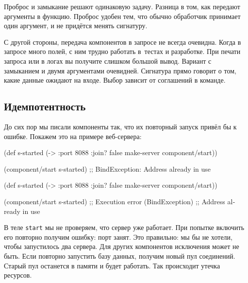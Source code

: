 \fi

Проброс и замыкание решают одинаковую задачу. Разница в том, как передают
аргументы в функцию. Проброс удобен тем, что обычно обработчик принимает один
аргумент, и не придётся менять сигнатуру.

С другой стороны, передача компонентов в запросе не всегда очевидна. Когда в
запросе много полей, с ним трудно работать в~тестах и разработке. При печати
запроса или в логах вы получите слишком большой вывод. Вариант с замыканием и
двумя аргументами очевидней. Сигнатура прямо говорит о том, какие данные ожидают
на входе. Выбор зависит от соглашений в команде.

\subsection{Идемпотентность}

До сих пор мы писали компоненты так, что их повторный запуск привёл бы к
ошибке. Покажем это на примере веб-сервера:

\ifx\DEVICETYPE\MOBILE

\begin{english}
  \begin{clojure}
(def s-started
  (-> {:port 8088 :join? false}
      make-server
      component/start))

(component/start s-started)
;; BindException: Address already in use
  \end{clojure}
\end{english}

\else

\begin{english}
  \begin{clojure}
(def s-started (-> {:port 8088 :join? false}
                    make-server
                    component/start))

(component/start s-started)
;; Execution error (BindException)
;; Address already in use
  \end{clojure}
\end{english}

\fi

В теле \verb|start| мы не проверяем, что сервер уже работает. При попытке
включить его повторно получим ошибку: порт занят. Это правильно: мы бы не
хотели, чтобы запустилось два сервера. Для других компонентов исключения может
не быть. Если повторно запустить базу данных, получим новый пул
соединений. Старый пул останется в памяти и будет работать. Так происходит
утечка ресурсов.

